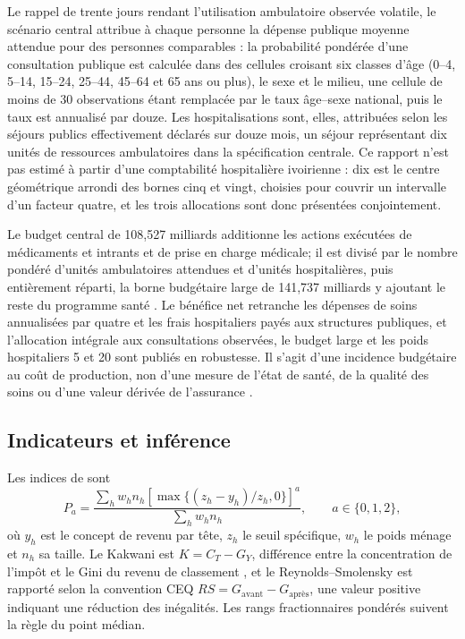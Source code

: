 \documentclass[11pt,a4paper]{article}
\begin{document}
Le rappel de trente jours rendant l'utilisation ambulatoire observée volatile,
le scénario central attribue à chaque personne la dépense publique moyenne
attendue pour des personnes comparables : la probabilité pondérée d'une
consultation publique est calculée dans des cellules croisant six classes d'âge
(0--4, 5--14, 15--24, 25--44, 45--64 et 65 ans ou plus), le sexe et le milieu,
une cellule de moins de 30 observations étant remplacée par le taux âge--sexe
national, puis le taux est annualisé par douze. Les hospitalisations sont, elles,
attribuées selon les séjours publics effectivement déclarés sur douze mois, un
séjour représentant dix unités de ressources ambulatoires dans la spécification
centrale. Ce rapport n'est pas estimé à partir d'une comptabilité hospitalière
ivoirienne : dix est le centre géométrique arrondi des bornes cinq et vingt,
choisies pour couvrir un intervalle d'un facteur quatre, et les trois
allocations sont donc présentées conjointement.

Le budget central de 108,527 milliards additionne les actions exécutées de
médicaments et intrants et de prise en charge médicale; il est divisé par le
nombre pondéré d'unités ambulatoires attendues et d'unités hospitalières, puis
entièrement réparti, la borne budgétaire large de 141,737 milliards y ajoutant
le reste du programme santé \citep{civperformance2021}. Le bénéfice net
retranche les dépenses de soins annualisées par quatre et les frais hospitaliers
payés aux structures publiques, et l'allocation intégrale aux consultations
observées, le budget large et les poids hospitaliers 5 et 20 sont publiés en
robustesse. Il s'agit d'une incidence budgétaire au coût de production, non
d'une mesure de l'état de santé, de la qualité des soins ou d'une valeur dérivée
de l'assurance \citep{demery2003,lustig2022}.

\subsection{Indicateurs et inférence}

Les indices de \citet{fgt1984} sont
\begin{equation}
P_a=\frac{\sum_h w_hn_h
\left[\max\{(z_h-y_h)/z_h,0\}\right]^a}
{\sum_h w_hn_h},\qquad a\in\{0,1,2\},
\label{eq:fgt}
\end{equation}
où $y_h$ est le concept de revenu par tête, $z_h$ le seuil spécifique, $w_h$ le
poids ménage et $n_h$ sa taille. Le Kakwani est $K=C_T-G_Y$, différence entre la
concentration de l'impôt et le Gini du revenu de classement
\citep{kakwani1977}, et le Reynolds--Smolensky \citep{reynolds1977} est rapporté
selon la convention CEQ $RS=G_{\text{avant}}-G_{\text{après}}$, une valeur
positive indiquant une réduction des inégalités. Les rangs fractionnaires
pondérés suivent la règle du point médian.
\end{document}
